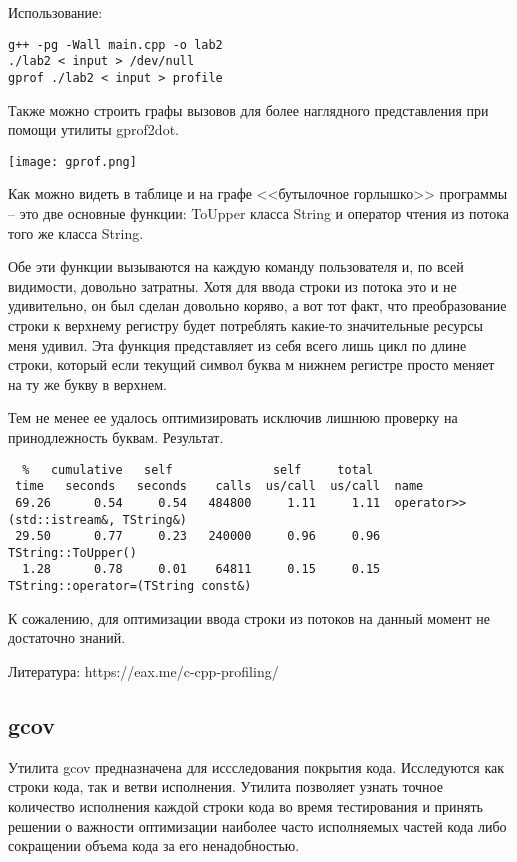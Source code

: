\documentclass[12pt]{article}
\begin{document}
Использование:
\begin{lstlisting}
g++ -pg -Wall main.cpp -o lab2
./lab2 < input > /dev/null
gprof ./lab2 < input > profile
\end{lstlisting}

Также можно строить графы вызовов для более наглядного представления при помощи утилиты gprof2dot. 

\begin{center}
    \texttt{[image: gprof.png]}
\end{center}

Как можно видеть в таблице и на графе <<бутылочное горлышко>> программы -- это две основные функции: ToUpper класса String и оператор чтения из потока того же класса String.

Обе эти функции вызываются на каждую команду пользователя и, по всей видимости, довольно затратны.
Хотя для ввода строки из потока это и не удивительно, он был сделан довольно коряво, а вот тот факт, что преобразование строки к верхнему регистру будет потреблять какие-то значительные ресурсы меня удивил.
Эта функция представляет из себя всего лишь цикл по длине строки, который если текущий символ буква м нижнем регистре просто меняет на ту же букву в верхнем.

Тем не менее ее удалось оптимизировать исключив лишнюю проверку на принодлежность буквам.
Результат.
\begin{small}
\footnotesize
\begin{verbatim}
  %   cumulative   self              self     total           
 time   seconds   seconds    calls  us/call  us/call  name    
 69.26      0.54     0.54   484800     1.11     1.11  operator>>(std::istream&, TString&)
 29.50      0.77     0.23   240000     0.96     0.96  TString::ToUpper()
  1.28      0.78     0.01    64811     0.15     0.15  TString::operator=(TString const&)
\end{verbatim}
\end{small}
К сожалению, для оптимизации ввода строки из потоков на данный момент не достаточно знаний.

Литература:
https://eax.me/c-cpp-profiling/

\subsection*{gcov}

Утилита gcov предназначена для иссследования покрытия кода. Исследуются как строки кода, так и ветви исполнения. Утилита позволяет узнать точное количество исполнения каждой строки кода во время тестирования и принять решении о важности оптимизации наиболее часто исполняемых частей кода либо сокращении объема кода за его ненадобностью.
\end{document}
